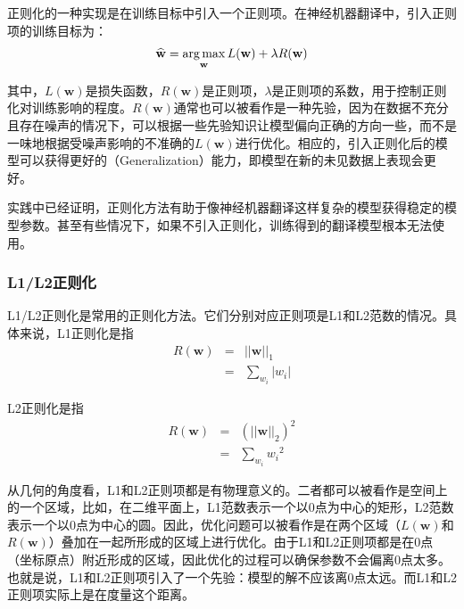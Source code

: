 \parinterval 正则化的一种实现是在训练目标中引入一个正则项。在神经机器翻译中，引入正则项的训练目标为：
\begin{eqnarray}
\widehat{\mathbf{w}}=\operatorname*{arg\,max}_{\mathbf{w}}L(\mathbf{w}) + \lambda R(\mathbf{w})
\label{eq:7-2}
\end{eqnarray}

\noindent 其中，$L(\mathbf{w})$是损失函数，$R(\mathbf{w})$是正则项，$\lambda$是正则项的系数，用于控制正则化对训练影响的程度。$R(\mathbf{w})$通常也可以被看作是一种先验，因为在数据不充分且存在噪声的情况下，可以根据一些先验知识让模型偏向正确的方向一些，而不是一味地根据受噪声影响的不准确的$L(\mathbf{w})$进行优化。相应的，引入正则化后的模型可以获得更好的{\small{}}（Generalization）能力，即模型在新的未见数据上表现会更好。

\parinterval 实践中已经证明，正则化方法有助于像神经机器翻译这样复杂的模型获得稳定的模型参数。甚至有些情况下，如果不引入正则化，训练得到的翻译模型根本无法使用。

\vspace{-0.5em}
\subsubsection{L1/L2正则化}

\parinterval L1/L2正则化是常用的正则化方法。它们分别对应正则项是L1和L2范数的情况。具体来说，L1正则化是指
\begin{eqnarray}
R(\mathbf{w}) & = & \big| |\mathbf{w}| {\big|}_1 \\
			     & =  &\sum_{w_i}|w_i| \nonumber
\label{eq:7-3}
\end{eqnarray}

\parinterval L2正则化是指
\begin{eqnarray}
R(\mathbf{w}) & = & (\big| |\mathbf{w}| {\big|}_2)^2 \\
			     & =  &\sum_{w_i}{w_i}^2 \nonumber
\label{eq:7-4}
\end{eqnarray}

\parinterval 从几何的角度看，L1和L2正则项都是有物理意义的。二者都可以被看作是空间上的一个区域，比如，在二维平面上，L1范数表示一个以0点为中心的矩形，L2范数表示一个以0点为中心的圆。因此，优化问题可以被看作是在两个区域（$L(\mathbf{w})$和$R(\mathbf{w})$）叠加在一起所形成的区域上进行优化。由于L1和L2正则项都是在0点（坐标原点）附近形成的区域，因此优化的过程可以确保参数不会偏离0点太多。也就是说，L1和L2正则项引入了一个先验：模型的解不应该离0点太远。而L1和L2正则项实际上是在度量这个距离。

